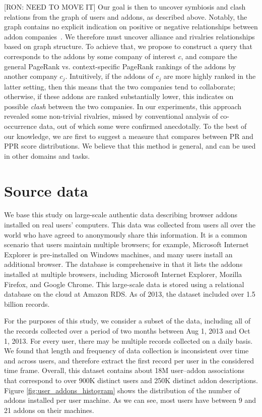 \documentclass[ijoc,nonblindrev]{informs3} %
\numberwithin{equation}{subsection}
\begin{document}
[RON: NEED TO MOVE IT] Our goal is then to uncover symbiosis and clash relations from the graph of users and addons, as described above. Notably, the graph contains no explicit indication on positive or negative relationships between addon companies~\citep{kunegisWWW08,kerchoveICDM08}. We therefore must uncover alliance and rivalries relationships based on graph structure. To achieve that, we propose to construct a query that corresponds to the addons by some company of interest $c$, and compare the general PageRank vs. context-specific PageRank rankings of the addons by another company $c_j$. Intuitively, if the addons of $c_j$ are more highly ranked in the latter setting, then this means that the two companies tend to collaborate; otherwise, if these addons are ranked substantially lower, this indicates on possible {\it clash} between the two companies. In our experiments, this approach revealed some non-trivial rivalries, missed by conventional analysis of co-occurrence data, out of which some were confirmed anecdotally. To the best of our knowledge, we are first to suggest a measure that compares between PR and PPR score distributions. We believe that this method is general, and can be used in other domains and tasks. 


\section{Source data}
\label{sec:datasets}

We base this study on large-scale authentic data describing browser addons installed on real users' computers. This data was collected from users all over the world who have agreed to anonymously share this information. It is a common scenario that users maintain multiple browsers; for example, Microsoft Internet Explorer is pre-installed on Windows machines, and many users install an additional browser. The database is comprehensive in that it lists the addons installed at multiple browsers, including Microsoft Internet Explorer, Mozilla Firefox, and Google Chrome. This large-scale data is stored using a relational database on the cloud at Amazon RDS. As of 2013, the dataset included over 1.5 billion records. 

For the purposes of this study, we consider a subset of the data, including all of the records collected over a period of two months between Aug 1, 2013 and Oct 1, 2013. For every user, there may be multiple records collected on a daily basis. We found that length and frequency of data collection is inconsistent over time and across users, and therefore extract the first record per user in the considered time frame. Overall, this dataset contains about 18M user--addon associations that correspond to over 900K distinct users and 250K distinct addon descriptions. Figure \ref{fig:user_addons_histogram} shows the distribution of the number of addons installed per user machine. As we can see,  most users have between 9 and 21 addons on their machines.
\end{document}
